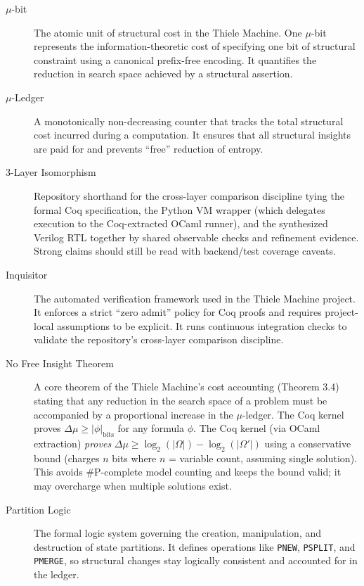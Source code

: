 \label{app:glossary}

\begin{description}
    \item[$\mu$-bit] The atomic unit of structural cost in the Thiele Machine. One $\mu$-bit represents the information-theoretic cost of specifying one bit of structural constraint using a canonical prefix-free encoding. It quantifies the reduction in search space achieved by a structural assertion.

    \item[$\mu$-Ledger] A monotonically non-decreasing counter that tracks the total structural cost incurred during a computation. It ensures that all structural insights are paid for and prevents ``free'' reduction of entropy.

    \item[3-Layer Isomorphism] Repository shorthand for the cross-layer comparison discipline tying the formal Coq specification, the Python VM wrapper (which delegates execution to the Coq-extracted OCaml runner), and the synthesized Verilog RTL together by shared observable checks and refinement evidence. Strong claims should still be read with backend/test coverage caveats.

    \item[Inquisitor] The automated verification framework used in the Thiele Machine project. It enforces a strict ``zero admit'' policy for Coq proofs and requires project-local assumptions to be explicit. It runs continuous integration checks to validate the repository's cross-layer comparison discipline.

    \item[No Free Insight Theorem] A core theorem of the Thiele Machine's cost accounting (Theorem 3.4) stating that any reduction in the search space of a problem must be accompanied by a proportional increase in the $\mu$-ledger. The Coq kernel proves $\Delta \mu \ge |\phi|_{\text{bits}}$ for any formula $\phi$. The Coq kernel (via OCaml extraction) \emph{proves} $\Delta \mu \ge \log_2(|\Omega|) - \log_2(|\Omega'|)$ using a conservative bound (charges $n$ bits where $n$ = variable count, assuming single solution). This avoids \#P-complete model counting and keeps the bound valid; it may overcharge when multiple solutions exist.

    \item[Partition Logic] The formal logic system governing the creation, manipulation, and destruction of state partitions. It defines operations like \texttt{PNEW}, \texttt{PSPLIT}, and \texttt{PMERGE}, so structural changes stay logically consistent and accounted for in the ledger.


\end{description}
